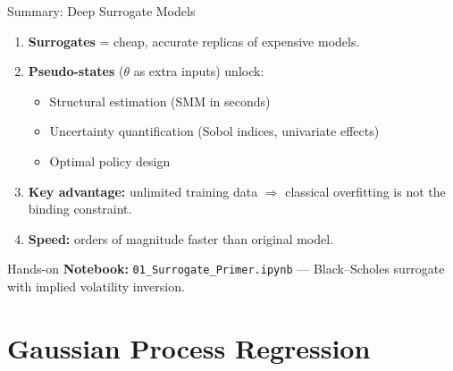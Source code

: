 \documentclass[aspectratio=169,11pt]{beamer}
\begin{document}
\begin{frame}{Summary: Deep Surrogate Models}
\begin{enumerate}
  \item \textbf{Surrogates} = cheap, accurate replicas of expensive models.
  \item \textbf{Pseudo-states} ($\theta$ as extra inputs) unlock:
  \begin{itemize}
    \item Structural estimation (SMM in seconds)
    \item Uncertainty quantification (Sobol indices, univariate effects)
    \item Optimal policy design
  \end{itemize}
  \item \textbf{Key advantage:} unlimited training data $\Rightarrow$ classical overfitting is not the binding constraint.
  \item \textbf{Speed:} orders of magnitude faster than original model.
\end{enumerate}

\vspace{0.3cm}
\begin{block}{Hands-on}
\textbf{Notebook:} \texttt{01\_Surrogate\_Primer.ipynb} --- Black--Scholes surrogate with implied volatility inversion.
\end{block}
\end{frame}

\section{Gaussian Process Regression}
\end{document}
